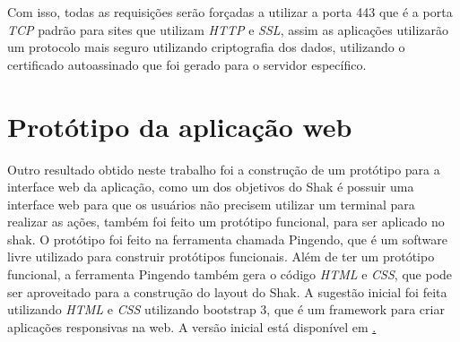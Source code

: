 Com isso, todas as requisições serão forçadas a utilizar a porta 443 que é a porta
\textit{TCP} padrão para sites que utilizam \textit{HTTP} e \textit{SSL}, assim as aplicações utilizarão
um protocolo mais seguro utilizando criptografia dos dados, utilizando o
certificado autoassinado que foi gerado para o servidor específico.

\section{Protótipo da aplicação web}
\label{sub:prototipo}

Outro resultado obtido neste trabalho foi a construção de um protótipo para a interface
web da aplicação, como um dos objetivos do Shak é possuir uma interface web para que
os usuários não precisem utilizar um terminal para realizar as ações, também foi
feito um protótipo funcional, para ser aplicado no shak. O protótipo foi feito
na ferramenta chamada Pingendo, que é um software livre utilizado para construir
protótipos funcionais. Além de ter um protótipo funcional, a ferramenta Pingendo
também gera o código \textit{HTML} e \textit{CSS}, que pode ser aproveitado para 
a construção do layout do Shak. A sugestão inicial foi feita utilizando \textit{HTML} e \textit{CSS} utilizando
bootstrap 3, que é um framework para criar aplicações responsivas na web. A versão
inicial está disponível em \href{https://gitlab.com/Thiagovsk/shak_frontend/tree/master}.


